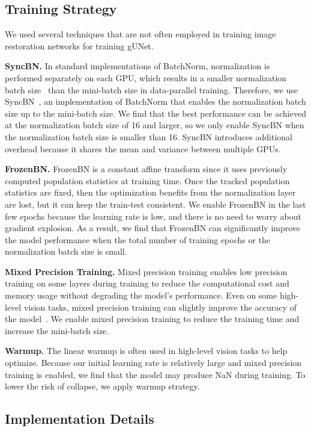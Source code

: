 \documentclass[10pt,twocolumn,letterpaper]{article}
\begin{document}
\subsection{Training Strategy}


We used several techniques that are not often employed in training image restoration networks for training gUNet. 

\noindent\textbf{SyncBN.}
In standard implementations of BatchNorm, normalization is performed separately on each GPU, which results in a smaller normalization batch size~\cite{wu2021rethinking} than the mini-batch size in data-parallel training.
Therefore, we use SyncBN~\cite{peng2018megdet}, an implementation of BatchNorm that enables the normalization batch size up to the mini-batch size.
We find that the best performance can be achieved at the normalization batch size of 16 and larger, so we only enable SyncBN when the normalization batch size is smaller than 16.
SyncBN introduces additional overhead because it shares the mean and variance between multiple GPUs.

\noindent\textbf{FrozenBN.}
FrozenBN is a constant affine transform since it uses previously computed population statistics at training time.
Once the tracked population statistics are fixed, then the optimization benefits from the normalization layer are lost, but it can keep the train-test consistent.
We enable FrozenBN in the last few epochs because the learning rate is low, and there is no need to worry about gradient explosion.
As a result, we find that FrozenBN can significantly improve the model performance when the total number of training epochs or the normalization batch size is small.

\noindent\textbf{Mixed Precision Training.}
Mixed precision training enables low precision training on some layers during training to reduce the computational cost and memory usage without degrading the model's performance.
Even on some high-level vision tasks, mixed precision training can slightly improve the accuracy of the model~\cite{he2019bag}.
We enable mixed precision training to reduce the training time and increase the mini-batch size.

\noindent\textbf{Warmup.}
The linear warmup is often used in high-level vision tasks to help optimize.
Because our initial learning rate is relatively large and mixed precision training is enabled, we find that the model may produce NaN during training.
To lower the risk of collapse, we apply warmup strategy.

\subsection{Implementation Details}
\end{document}
